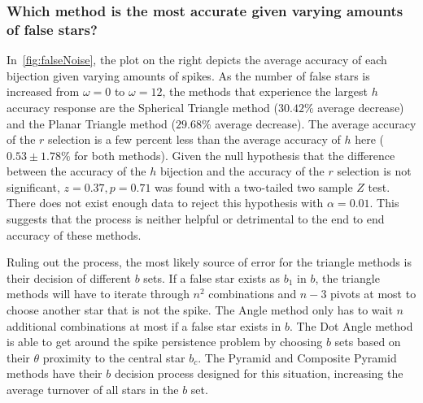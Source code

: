 \subsubsection{Which method is the most accurate given varying amounts of false stars?}
%
%
%
%
In~\autoref{fig:falseNoise}, the plot on the right depicts the average accuracy of each bijection given varying amounts
of spikes.
As the number of false stars is increased from $\omega = 0$ to $\omega = 12$, the methods that experience the largest
$h$ accuracy response are the Spherical Triangle method ($30.42\%$ average decrease) and the Planar Triangle method
($29.68\%$ average decrease).
The average accuracy of the $r$ selection is a few percent less than the average accuracy of $h$ here
($0.53 \pm 1.78\%$ for both methods).
Given the null hypothesis that the difference between the accuracy of the $h$ bijection and the accuracy of the $r$
selection is not significant, $z = 0.37, p = 0.71$ was found with a two-tailed two sample $Z$ test.
There does not exist enough data to reject this hypothesis with $\alpha = 0.01$.
This suggests that the  process is neither helpful or detrimental to the end to end accuracy of these
methods.

Ruling out the  process, the most likely source of error for the triangle methods is their decision of
different $b$ sets.
If a false star exists as $b_1$ in $b$, the triangle methods will have to iterate through $n^2$ combinations and $n - 3$
pivots at most to choose another star that is not the spike.
The Angle method only has to wait $n$ additional combinations at most if a false star exists in $b$.
The Dot Angle method is able to get around the spike persistence problem by choosing $b$ sets based on their $\theta$
proximity to the central star $b_c$.
The Pyramid and Composite Pyramid methods have their $b$ decision process designed for this situation, increasing the
average turnover of all stars in the $b$ set.

